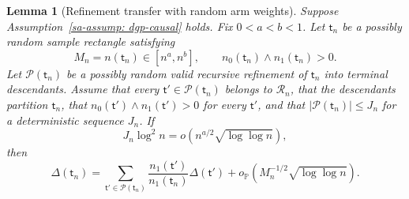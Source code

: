 \documentclass[10pt,a4paper]{amsart}
\newtheorem{lemma}{Lemma}
\def\P{\mathbb{P}}
\def\nodet{\mathsf{t}}
\begin{document}
\begin{lemma}[Refinement transfer with random arm weights]\label{sa-lem:refinement-transfer-causal}
Suppose Assumption~\ref{sa-assump: dgp-causal} holds. Fix $0<a<b<1$. Let $\nodet_n$ be a possibly random sample rectangle satisfying
\[
    M_n=n(\nodet_n)\in[n^a,n^b],
    \qquad
    n_0(\nodet_n)\wedge n_1(\nodet_n)>0.
\]
Let $\mathcal P(\nodet_n)$ be a possibly random valid recursive refinement of $\nodet_n$ into terminal descendants. Assume that every $\nodet'\in\mathcal P(\nodet_n)$ belongs to $\mathcal R_n$, that the descendants partition $\nodet_n$, that $n_0(\nodet')\wedge n_1(\nodet')>0$ for every $\nodet'$, and that $|\mathcal P(\nodet_n)|\leq J_n$ for a deterministic sequence $J_n$. If
\[
    J_n\log^2 n
    =
    o\!\left(n^{a/2}\sqrt{\log\log n}\right),
\]
then
\[
    \Delta(\nodet_n)
    =
    \sum_{\nodet'\in\mathcal P(\nodet_n)}
    \frac{n_1(\nodet')}{n_1(\nodet_n)}
    \Delta(\nodet')
    +
    o_\P\!\left(M_n^{-1/2}\sqrt{\log\log n}\right).
\]
\end{lemma}
\end{document}
